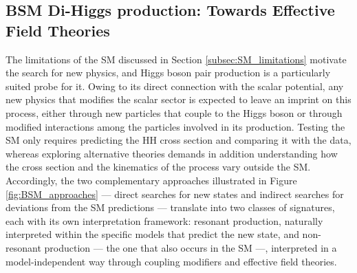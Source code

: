 \subsection{BSM Di-Higgs production: Towards Effective Field Theories}
\label{subsec:BSM_production}
%
The limitations of the SM discussed in Section \ref{subsec:SM_limitations} motivate the search for new physics, and Higgs boson pair production is a particularly suited probe for it. Owing to its direct connection with the scalar potential, any new physics that modifies the scalar sector is expected to leave an imprint on this process, either through new particles that couple to the Higgs boson or through modified interactions among the particles involved in its production. Testing the SM only requires predicting the HH cross section and comparing it with the data, whereas exploring alternative theories demands in addition understanding how the cross section and the kinematics of the process vary outside the SM. Accordingly, the two complementary approaches illustrated in Figure \ref{fig:BSM_approaches} — direct searches for new states and indirect searches for deviations from the SM predictions — translate into two classes of signatures, each with its own interpretation framework: resonant production, naturally interpreted within the specific models that predict the new state, and non-resonant production — the one that also occurs in the SM —, interpreted in a model-independent way through coupling modifiers and effective field theories.\medskip

